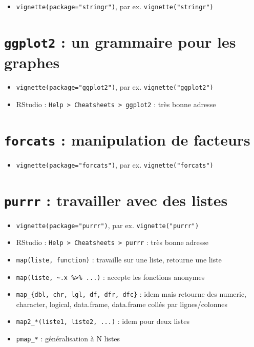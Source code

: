 \documentclass[
  letterpaper,
  DIV=11,
  numbers=noendperiod]{scrreprt}
\providecommand{\tightlist}{%
  \setlength{\itemsep}{0pt}\setlength{\parskip}{0pt}}\usepackage{longtable,booktabs,array}
\begin{document}
\begin{itemize}
\tightlist
\item
  \texttt{vignette(package="stringr")}, par ex.
  \texttt{vignette("stringr")}
\end{itemize}

\hypertarget{ggplot2-un-grammaire-pour-les-graphes}{%
\section{\texorpdfstring{\texttt{ggplot2} : un grammaire pour les
graphes}{ggplot2 : un grammaire pour les graphes}}\label{ggplot2-un-grammaire-pour-les-graphes}}

\begin{itemize}
\tightlist
\item
  \texttt{vignette(package="ggplot2")}, par ex.
  \texttt{vignette("ggplot2")}
\item
  RStudio :
  \texttt{Help\ \textgreater{}\ Cheatsheets\ \textgreater{}\ ggplot2} :
  très bonne adresse
\end{itemize}

\hypertarget{forcats-manipulation-de-facteurs}{%
\section{\texorpdfstring{\texttt{forcats} : manipulation de
facteurs}{forcats : manipulation de facteurs}}\label{forcats-manipulation-de-facteurs}}

\begin{itemize}
\tightlist
\item
  \texttt{vignette(package="forcats")}, par ex.
  \texttt{vignette("forcats")}
\end{itemize}

\hypertarget{purrr-travailler-avec-des-listes}{%
\section{\texorpdfstring{\texttt{purrr} : travailler avec des
listes}{purrr : travailler avec des listes}}\label{purrr-travailler-avec-des-listes}}

\begin{itemize}
\tightlist
\item
  \texttt{vignette(package="purrr")}, par ex. \texttt{vignette("purrr")}
\item
  RStudio :
  \texttt{Help\ \textgreater{}\ Cheatsheets\ \textgreater{}\ purrr} :
  très bonne adresse
\item
  \texttt{map(liste,\ function)} : travaille sur une liste, retourne une
  liste
\item
  \texttt{map(liste,\ \textasciitilde{}.x\ \%\textgreater{}\%\ ...)} :
  accepte les fonctions anonymes
\item
  \texttt{map\_\{dbl,\ chr,\ lgl,\ df,\ dfr,\ dfc\}} : idem mais
  retourne des numeric, character, logical, data.frame, data.frame
  collés par lignes/colonnes
\item
  \texttt{map2\_*(liste1,\ liste2,\ ...)} : idem pour deux listes
\item
  \texttt{pmap\_*} : généralisation à N listes
\end{itemize}
\end{document}
